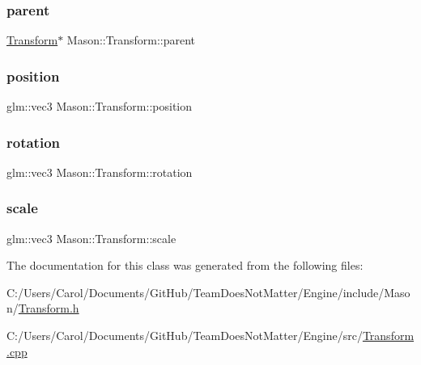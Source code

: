\hypertarget{class_mason_1_1_transform_a1e2c91adcef43bcc170803656260f9db}{}\label{class_mason_1_1_transform_a1e2c91adcef43bcc170803656260f9db} 
\subsubsection{\texorpdfstring{parent}{parent}}
{\footnotesize\ttfamily \hyperlink{class_mason_1_1_transform}{Transform}$\ast$ Mason\+::\+Transform\+::parent\hspace{0.3cm}{\ttfamily [protected]}}

\hypertarget{class_mason_1_1_transform_ac9e11b4ec4433a38ac1100f12c955dcb}{}\label{class_mason_1_1_transform_ac9e11b4ec4433a38ac1100f12c955dcb} 
\subsubsection{\texorpdfstring{position}{position}}
{\footnotesize\ttfamily glm\+::vec3 Mason\+::\+Transform\+::position\hspace{0.3cm}{\ttfamily [protected]}}

\hypertarget{class_mason_1_1_transform_ae2f541ade79d561584619e93edb034ae}{}\label{class_mason_1_1_transform_ae2f541ade79d561584619e93edb034ae} 
\subsubsection{\texorpdfstring{rotation}{rotation}}
{\footnotesize\ttfamily glm\+::vec3 Mason\+::\+Transform\+::rotation\hspace{0.3cm}{\ttfamily [protected]}}

\hypertarget{class_mason_1_1_transform_a4618b31e34a6ec8a0ee638401fc56367}{}\label{class_mason_1_1_transform_a4618b31e34a6ec8a0ee638401fc56367} 
\subsubsection{\texorpdfstring{scale}{scale}}
{\footnotesize\ttfamily glm\+::vec3 Mason\+::\+Transform\+::scale\hspace{0.3cm}{\ttfamily [protected]}}



The documentation for this class was generated from the following files\+:\begin{DoxyCompactItemize}
\item 
C\+:/\+Users/\+Carol/\+Documents/\+Git\+Hub/\+Team\+Does\+Not\+Matter/\+Engine/include/\+Mason/\hyperlink{_transform_8h}{Transform.\+h}\item 
C\+:/\+Users/\+Carol/\+Documents/\+Git\+Hub/\+Team\+Does\+Not\+Matter/\+Engine/src/\hyperlink{_transform_8cpp}{Transform.\+cpp}\end{DoxyCompactItemize}
